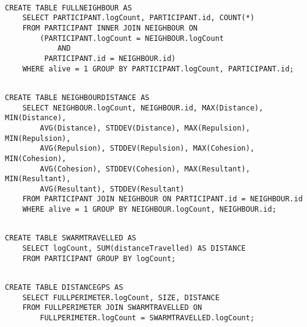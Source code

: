 \begin{lstlisting}[label={code:FULLNEIGHBOUR}]  % Start your code-block

CREATE TABLE FULLNEIGHBOUR AS 
	SELECT PARTICIPANT.logCount, PARTICIPANT.id, COUNT(*) 
	FROM PARTICIPANT INNER JOIN NEIGHBOUR ON 
		(PARTICIPANT.logCount = NEIGHBOUR.logCount 
			AND 
		 PARTICIPANT.id = NEIGHBOUR.id) 
	WHERE alive = 1 GROUP BY PARTICIPANT.logCount, PARTICIPANT.id;

\end{lstlisting}

\begin{lstlisting}[label={code:NEIGHBOURDISTANCE}]  % Start your code-block

CREATE TABLE NEIGHBOURDISTANCE AS 
	SELECT NEIGHBOUR.logCount, NEIGHBOUR.id, MAX(Distance), MIN(Distance), 
		AVG(Distance), STDDEV(Distance), MAX(Repulsion), MIN(Repulsion), 
		AVG(Repulsion), STDDEV(Repulsion), MAX(Cohesion), MIN(Cohesion), 
		AVG(Cohesion), STDDEV(Cohesion), MAX(Resultant), MIN(Resultant), 
		AVG(Resultant), STDDEV(Resultant)  
	FROM PARTICIPANT JOIN NEIGHBOUR ON PARTICIPANT.id = NEIGHBOUR.id 
	WHERE alive = 1 GROUP BY NEIGHBOUR.logCount, NEIGHBOUR.id;

\end{lstlisting}

\begin{lstlisting}[label={code:SWARMTRAVELLED}]  % Start your code-block

CREATE TABLE SWARMTRAVELLED AS 
	SELECT logCount, SUM(distanceTravelled) AS DISTANCE 
	FROM PARTICIPANT GROUP BY logCount;

\end{lstlisting}

\begin{lstlisting}[label={code:DISTANCEGPS}]  % Start your code-block

CREATE TABLE DISTANCEGPS AS 
	SELECT FULLPERIMETER.logCount, SIZE, DISTANCE 
	FROM FULLPERIMETER JOIN SWARMTRAVELLED ON 
		FULLPERIMETER.logCount = SWARMTRAVELLED.logCount;

\end{lstlisting}

